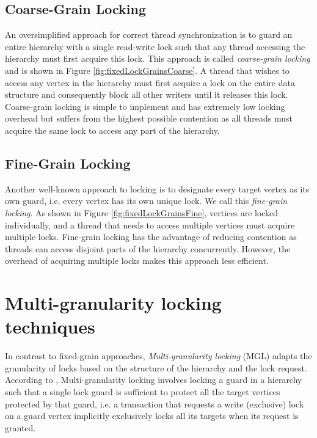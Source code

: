 \subsection{Coarse-Grain Locking}
An oversimplified approach for correct thread synchronization is to guard an entire hierarchy with a single read-write lock such that any thread accessing the hierarchy must first acquire this lock.
This approach is called \emph{coarse-grain locking} and is shown in Figure \ref{fig:fixedLockGrainsCoarse}.
A thread that wishes to access any vertex in the hierarchy must first acquire a lock on the entire data structure and consequently block all other writers until it releases this lock. 
Coarse-grain locking is simple to implement and has extremely low locking overhead but suffers from the highest possible contention as all threads must acquire the same lock to access any part of the hierarchy. 


\subsection{Fine-Grain Locking}
Another well-known approach to locking is to designate every target vertex as its own guard, i.e. every vertex has its own unique lock. 
We call this \emph{fine-grain locking}.
As shown in Figure \ref{fig:fixedLockGrainsFine}, vertices are locked individually, and a thread that needs to access multiple vertices must acquire multiple locks. 
Fine-grain locking has the advantage of reducing contention as threads can access disjoint parts of the hierarchy concurrently. 
However, the overhead of acquiring multiple locks makes this approach less efficient. 



\section{Multi-granularity locking techniques}

In contrast to fixed-grain approaches, \emph{Multi-granularity locking} (MGL) \cite{gray1975granularity} adapts the granularity of locks based on the structure of the hierarchy and the lock request. 
According to \citet{gray1975granularity}, Multi-granularity locking involves locking a guard in a hierarchy such that a single lock guard is sufficient to protect all the target vertices protected by that guard, i.e. a transaction that requests a write (exclusive) lock on a guard vertex implicitly exclusively locks all its targets when its request is granted. 


